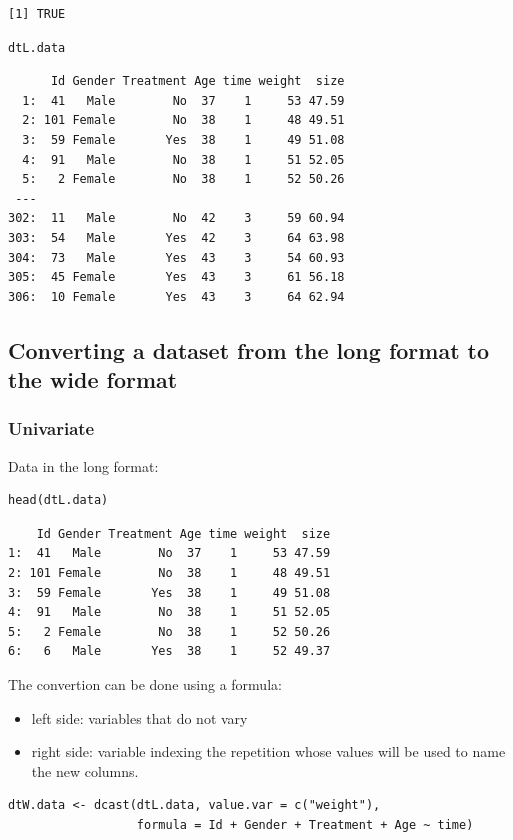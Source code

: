 \documentclass{article}
\begin{document}
\begin{verbatim}
[1] TRUE
\end{verbatim}

\lstset{language=r,label= ,caption= ,captionpos=b,numbers=none}
\begin{lstlisting}
dtL.data
\end{lstlisting}

\begin{verbatim}
      Id Gender Treatment Age time weight  size
  1:  41   Male        No  37    1     53 47.59
  2: 101 Female        No  38    1     48 49.51
  3:  59 Female       Yes  38    1     49 51.08
  4:  91   Male        No  38    1     51 52.05
  5:   2 Female        No  38    1     52 50.26
 ---                                           
302:  11   Male        No  42    3     59 60.94
303:  54   Male       Yes  42    3     64 63.98
304:  73   Male       Yes  43    3     54 60.93
305:  45 Female       Yes  43    3     61 56.18
306:  10 Female       Yes  43    3     64 62.94
\end{verbatim}

\subsection{Converting a dataset from the long format to the wide format}
\label{sec:orgf34a437}

\subsubsection{Univariate}
\label{sec:orge0c75b0}
Data in the long format:
\lstset{language=r,label= ,caption= ,captionpos=b,numbers=none}
\begin{lstlisting}
head(dtL.data)
\end{lstlisting}

\begin{verbatim}
    Id Gender Treatment Age time weight  size
1:  41   Male        No  37    1     53 47.59
2: 101 Female        No  38    1     48 49.51
3:  59 Female       Yes  38    1     49 51.08
4:  91   Male        No  38    1     51 52.05
5:   2 Female        No  38    1     52 50.26
6:   6   Male       Yes  38    1     52 49.37
\end{verbatim}

The convertion can be done using a formula:
\begin{itemize}
\item left side: variables that do not vary
\item right side: variable indexing the repetition whose values will be
used to name the new columns.
\end{itemize}
\lstset{language=r,label= ,caption= ,captionpos=b,numbers=none}
\begin{lstlisting}
dtW.data <- dcast(dtL.data, value.var = c("weight"),
				  formula = Id + Gender + Treatment + Age ~ time)
\end{lstlisting}
\end{document}

